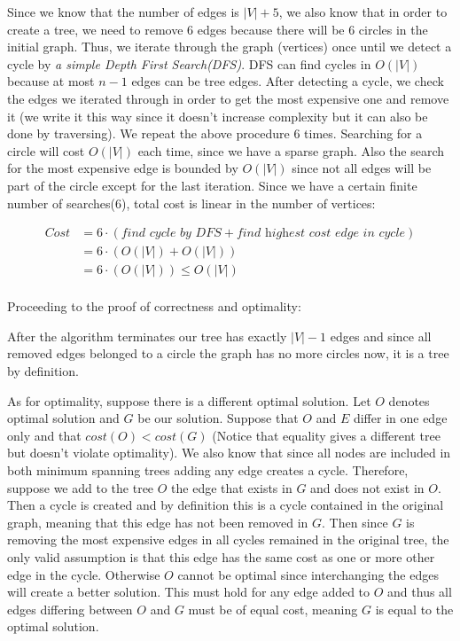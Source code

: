 Since we know that the number of edges is $|V| + 5$, we also know that in order to create a tree, we need to remove 6 edges because there will be 6 circles in the initial graph. Thus, we iterate through the graph (vertices) once until we detect a cycle by \textit{a simple Depth First Search(DFS)}. DFS can find cycles in $O(|V|)$ because at most $n - 1$ edges can be tree edges. After detecting a cycle, we check the edges we iterated through in order to get the most expensive one and remove it (we write it this way since it doesn't increase complexity but it can also be done by traversing). We repeat the above procedure 6 times. Searching for a circle will cost $O(|V|)$ each time, since we have a sparse graph. Also the search for the most expensive edge is bounded by $O(|V|)$ since not all edges will be part of the circle except for the last iteration. Since we have a certain finite number of searches(6), total cost is linear in the number of vertices:

\begin{align*}
  Cost &= 6 \cdot (\textit{find cycle by DFS} + \textit{find highest cost edge in cycle}) \\
       &= 6 \cdot (O(|V|) + O(|V|)) \\
       &= 6 \cdot (O(|V|)) \leq O(|V|) \\
\end{align*}

Proceeding to the proof of correctness and optimality:

After the algorithm terminates our tree has exactly $|V|-1$ edges and since all removed edges belonged to a circle the graph has no more circles now, it is a tree by definition. 

As for optimality, suppose there is a different optimal solution. Let $O$ denotes optimal solution and $G$ be our solution. Suppose that $O$ and $E$ differ in one edge only and that $cost(O) < cost(G)$ (Notice that equality gives a different tree but doesn't violate optimality). We also know that since all nodes are included in both minimum spanning trees adding any edge creates a cycle. Therefore, suppose we add to the tree $O$ the edge that exists in $G$ and does not exist in $O$. Then a cycle is created and by definition this is a cycle contained in the original graph, meaning that this edge has not been removed in $G$. Then since $G$ is removing the most expensive edges in all cycles remained in the original tree, the only valid assumption is that this edge has the same cost as one or more other edge in the cycle. Otherwise $O$ cannot be optimal since interchanging the edges will create a better solution. This must hold for any edge added to $O$ and thus all edges differing between $O$ and $G$ must be of equal cost, meaning $G$ is equal to the optimal solution.